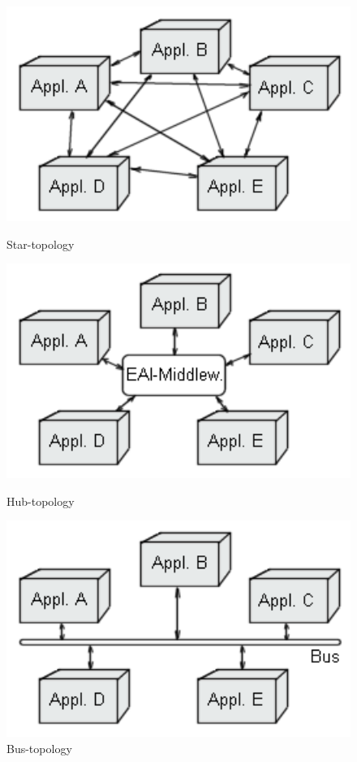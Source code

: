 \documentclass[12pt]{article}
\begin{document}
\begin{figure}[here!]
\centering
\begin{minipage}[h]{0.3\textwidth}
\centering
    \includegraphics[width=1.0\textwidth]{images/eai0.png}
    \caption{Star-topology \cite{thorstenhorn}}
    \label{fig:eai0}
\end{minipage}
\begin{minipage}[h]{0.3\textwidth}
\centering
    \includegraphics[width=1.0\textwidth]{images/eai1.png}
    \caption{Hub-topology \cite{thorstenhorn}}
    \label{fig:eai1}
\end{minipage}
\begin{minipage}[h]{0.3\textwidth}
\centering
    \includegraphics[width=1.0\textwidth]{images/eai2.png}
    \caption{Bus-topology \cite{thorstenhorn}}
    \label{fig:eai2}
\end{minipage}
\end{figure}
\FloatBarrier
\end{document}
